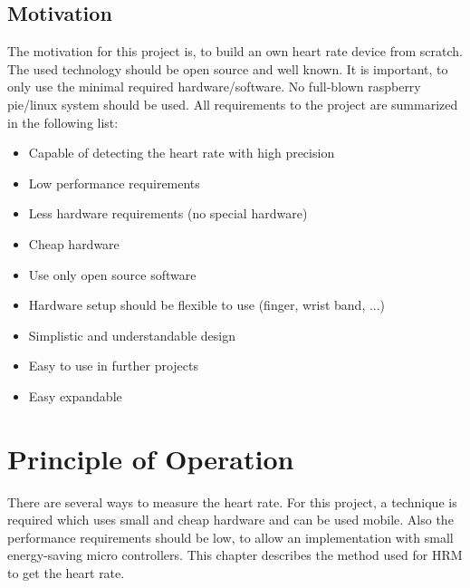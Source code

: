 \documentclass[notitlepage]{scrreprt}
\begin{document}
\section{Motivation}
The motivation for this project is, to build an own heart rate device from scratch. The used technology should be open source and well known. It is important, to only use the minimal required hardware/software. No full-blown raspberry pie/linux system should be used. All requirements to the project are summarized in the following list:

\begin{itemize}
	\item{Capable of detecting the heart rate with high precision}
	\item{Low performance requirements}
	\item{Less hardware requirements (no special hardware)}
	\item{Cheap hardware}
	\item{Use only open source software}
	\item{Hardware setup should be flexible to use (finger, wrist band, ...)}
	\item{Simplistic and understandable design}
	\item{Easy to use in further projects}
	\item{Easy expandable}
\end{itemize}

\chapter{Principle of Operation}
\label{chap:principle-of-operation}

There are several ways to measure the heart rate. For this project, a technique is required which uses small and cheap hardware and can be used mobile. Also the performance requirements should be low, to allow an implementation with small energy-saving micro controllers. This chapter describes the method used for HRM to get the heart rate.
\end{document}
